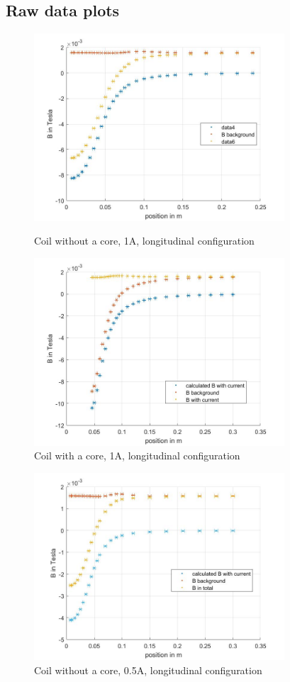 \documentclass[12pt]{article}
\begin{document}
	\subsection{Raw data plots}
		\begin{figure}[H]\label{fig:}
			\begin{minipage}[h]{.4\linewidth}
				\includegraphics[height=7cm]{long 1A ohne Kern nur Punkte.jpg}
				\caption{Coil without a core, 1A, longitudinal configuration}
			\end{minipage}
			\hspace{.1\linewidth}
			\begin{minipage}[h]{.4\linewidth}
				\includegraphics[height=7cm]{long 1A mit Kern nur Punkte.jpg}
				\caption{Coil with a core, 1A, longitudinal configuration}
			\end{minipage}
		\end{figure}
	
		\begin{figure}[H]
			\centering
			\includegraphics[height=7cm]{long 05A ohne Kern nur Punkte.jpg}
			\caption{Coil without a core, 0.5A, longitudinal configuration}
		\end{figure}
	
\end{document}
